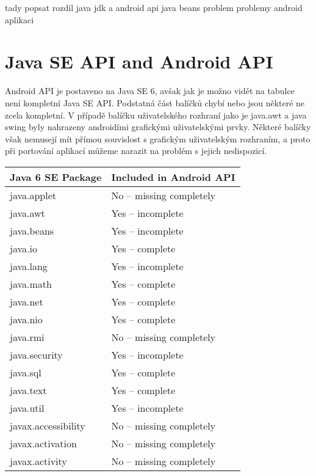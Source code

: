 tady popsat rozdil java jdk a android api
java beans problem
problemy android aplikaci


\section{Java SE API and Android API}
Android API je postaveno na Java SE 6, avšak jak je možno vidět na tabulce  není kompletní Java SE API. Podstatná část balíčků chybí nebo jsou některé ne zcela kompletní. V případě balíčku uživatelského rozhraní jako je java.awt a java swing byly nahrazeny androidími grafickými uživatelskými prvky. Některé balíčky však nemusejí mít přímou souvislost s grafickým uživatelským rozhraním, a proto při portování aplikací můžeme narazit na problém s jejich nedispozicí.

\begin {table}[h!]
\begin{tabular}{|l|l|}
\hline
{\bf Java 6 SE Package} & {\bf Included in Android API} \\
\hline \hline
java.applet             & No -- missing completely    \\
java.awt                & Yes -- incomplete            \\
java.beans              & Yes -- incomplete            \\
java.io	                & Yes -- complete            \\
java.lang	            & Yes -- incomplete            \\
java.math	            & Yes -- complete            \\
java.net	            & Yes -- complete             \\
java.nio	            & Yes -- complete             \\
java.rmi	            & No  -- missing completely    \\
java.security	        & Yes -- incomplete            \\
java.sql	            & Yes -- complete            \\
java.text	            & Yes -- complete              \\
java.util	            & Yes -- incomplete            \\
javax.accessibility     & No -- missing completely    \\
javax.activation	    & No -- missing completely    \\
javax.activity	        & No -- missing completely    \\

\end{tabular}
\end{table}
